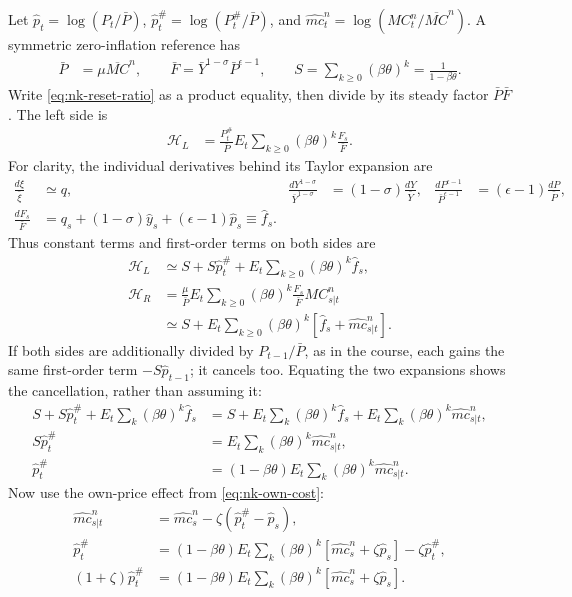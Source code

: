 Let $\hat p_t=\log(P_t/\bar P)$, $\hat p_t^{\#}=\log(P_t^{\#}/\bar P)$,
and $\hat{mc}_t^n=\log(MC_t^n/\overline{MC}^n)$.
A symmetric zero-inflation reference has
\begin{align}
 \bar P&=\mu\overline{MC}^n,\qquad
 \bar F=\bar Y^{1-\sigma}\bar P^{\epsilon-1},\qquad
 S=\sum_{k\geq0}(\beta\theta)^k=\frac1{1-\beta\theta}.
\end{align}
Write \eqref{eq:nk-reset-ratio} as a product equality, then divide by its
steady factor $\bar P\bar F$. The left side is
\begin{align}
 \mathcal H_L&=\frac{P_t^{\#}}{\bar P}
             E_t\sum_{k\geq0}(\beta\theta)^k\frac{F_s}{\bar F}.
\end{align}
For clarity, the individual derivatives behind its Taylor expansion are
\begin{align}
 \frac{d\xi}{\bar\xi}&\simeq q,&
 \frac{dY^{1-\sigma}}{\bar Y^{1-\sigma}}&=(1-\sigma)\frac{dY}{\bar Y},&
 \frac{dP^{\epsilon-1}}{\bar P^{\epsilon-1}}&=(\epsilon-1)\frac{dP}{\bar P},\\
 \frac{dF_s}{\bar F}&=q_s+(1-\sigma)\hat y_s+(\epsilon-1)\hat p_s
                  \equiv\hat f_s.
\end{align}
Thus constant terms and first-order terms on both sides are
\begin{align}
 \mathcal H_L&\simeq S+S\hat p_t^{\#}
                  +E_t\sum_{k\geq0}(\beta\theta)^k\hat f_s,\\
 \mathcal H_R&=\frac\mu{\bar P}E_t\sum_{k\geq0}(\beta\theta)^k
                                    \frac{F_s}{\bar F}MC_{s|t}^n\\
 &\simeq S+E_t\sum_{k\geq0}(\beta\theta)^k
                         [\hat f_s+\hat{mc}_{s|t}^n].
\end{align}
If both sides are additionally divided by $P_{t-1}/\bar P$, as in the course,
each gains the same first-order term $-S\hat p_{t-1}$; it cancels too.
Equating the two expansions shows the cancellation, rather than assuming it:
\begin{align}
 S+S\hat p_t^{\#}+E_t\sum_k(\beta\theta)^k\hat f_s
 &=S+E_t\sum_k(\beta\theta)^k\hat f_s
       +E_t\sum_k(\beta\theta)^k\hat{mc}_{s|t}^n,\\
 S\hat p_t^{\#}&=E_t\sum_k(\beta\theta)^k\hat{mc}_{s|t}^n,\\
 \hat p_t^{\#}&=(1-\beta\theta)E_t\sum_k(\beta\theta)^k
                                      \hat{mc}_{s|t}^n.
\end{align}
Now use the own-price effect from \eqref{eq:nk-own-cost}:
\begin{align}
 \hat{mc}_{s|t}^n&=\hat{mc}_s^n-\zeta(\hat p_t^{\#}-\hat p_s),\\
 \hat p_t^{\#}&=(1-\beta\theta)E_t\sum_k(\beta\theta)^k
       [\hat{mc}_s^n+\zeta\hat p_s]-\zeta\hat p_t^{\#},\\
 (1+\zeta)\hat p_t^{\#}
 &=(1-\beta\theta)E_t\sum_k(\beta\theta)^k
                  [\hat{mc}_s^n+\zeta\hat p_s].
\end{align}
